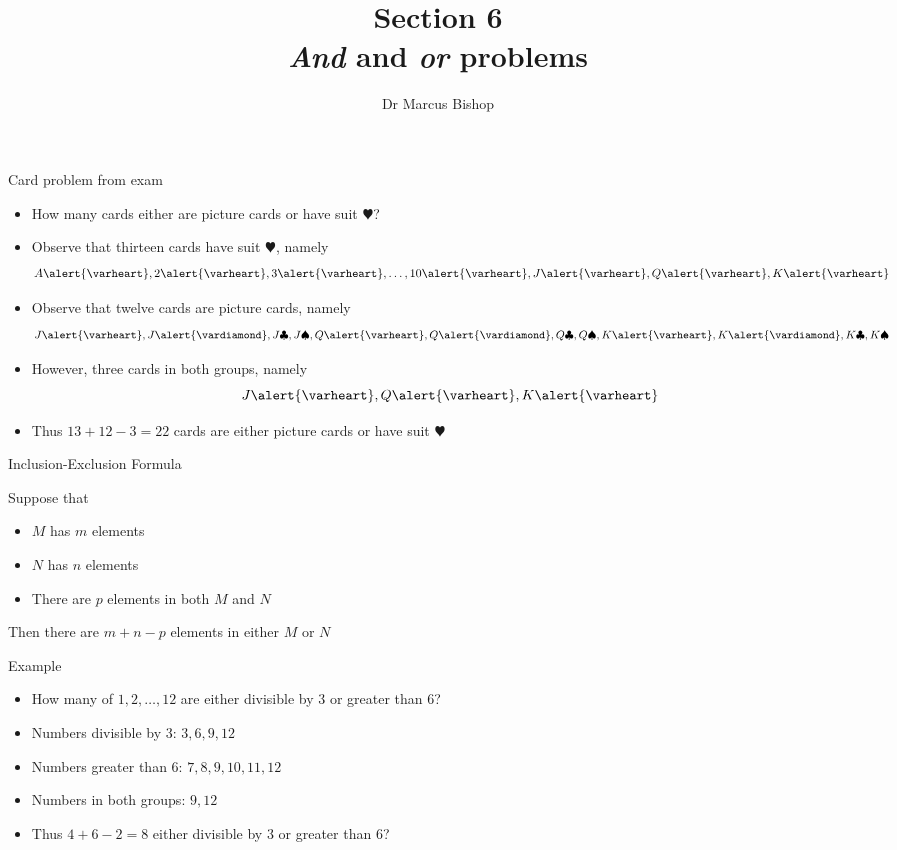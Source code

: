 \documentclass[handout]{beamer}
\title[\S6]{Section 6\\{\em And} and {\em or} problems}
\author{Dr Marcus Bishop}
\theoremstyle{definition}
\begin{document}
\begin{frame}\titlepage\end{frame}
\LogoOff

\begin{frame}{Card problem from exam}
\begin{itemize}
\item How many cards either are picture cards or have
suit \alert{$\varheart$}?
\item Observe that thirteen cards have
suit \alert{$\varheart$}, namely
\[A\alert{\varheart},
2\alert{\varheart},
3\alert{\varheart},\ldots,
10\alert{\varheart},
J\alert{\varheart},
Q\alert{\varheart},
K\alert{\varheart}\]
\item Observe that twelve cards are picture cards, namely
\[J\alert{\varheart},J\alert{\vardiamond},J\clubsuit,J\spadesuit,
Q\alert{\varheart},Q\alert{\vardiamond},Q\clubsuit,Q\spadesuit,
K\alert{\varheart},K\alert{\vardiamond},K\clubsuit,K\spadesuit\]
\item However, \alert{three} cards in both groups,
namely
\[J\alert{\varheart},Q\alert{\varheart},K\alert{\varheart}\]
\item Thus $13+12-3=22$ cards are either picture cards or have 
suit \alert{$\varheart$}
\end{itemize}
\end{frame}

\begin{frame}{Inclusion-Exclusion Formula}
\begin{theorem}
Suppose that
\begin{itemize}
\item $M$ has $m$ elements 
\item $N$ has $n$ elements
\item There are $p$ elements in \alert{both} $M$ and $N$
\end{itemize}
Then there are $m+n-p$ elements in \alert{either} $M$ or $N$
\end{theorem}
\end{frame}

\begin{frame}{Example}
\begin{itemize}
\item How many of $1,2,\ldots,12$ are
either divisible by $3$ or greater than $6$?
\item Numbers divisible by $3$: $3,6,9,12$
\item Numbers greater than $6$: $7,8,9,10,11,12$
\item Numbers in both groups: $9,12$
\item Thus $4+6-2=8$
either divisible by $3$ or greater than $6$?
\end{itemize}
\end{frame}
\end{document}
